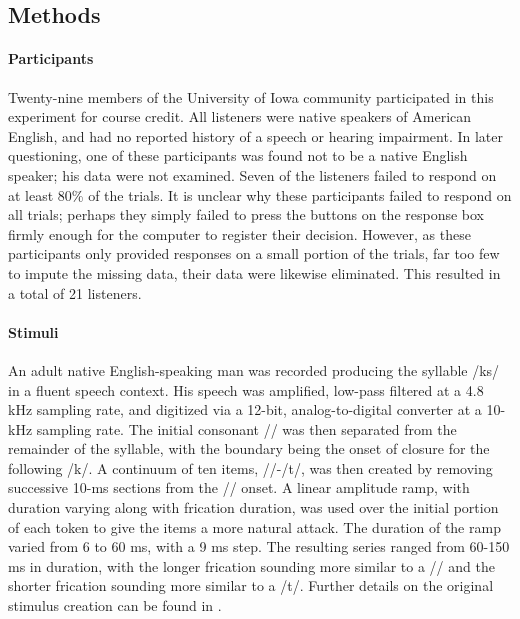 \subsection{Methods}

\paragraph{Participants}

Twenty-nine members of the University of Iowa community participated in this experiment for course credit. All listeners were native speakers of American English, and had no reported history of a speech or hearing impairment. In later questioning, one of these participants was found not to be a native English speaker; his data were not examined. Seven of the listeners failed to respond on at least 80\% of the trials. It is unclear why these participants failed to respond on all trials; perhaps they simply failed to press the buttons on the response box firmly enough for the computer to register their decision. However, as these participants only provided responses on a small portion of the trials, far too few to impute the missing data, their data were likewise eliminated. This resulted in a total of 21 listeners.

\paragraph{Stimuli}

An adult native English-speaking man was recorded producing the syllable /\textesh k\textscripta s/ in a fluent speech context. His speech was amplified, low-pass filtered at a 4.8 kHz sampling rate, and digitized via a 12-bit, analog-to-digital converter at a 10-kHz sampling rate. The initial consonant /\textesh/ was then separated from the remainder of the syllable, with the boundary being the onset of closure for the following /k/. A continuum of ten items, /\textesh/-/t\textesh/, was then created by removing successive 10-ms sections from the /\textesh/ onset. A linear amplitude ramp, with duration varying along with frication duration, was used over the initial portion of each token to give the items a more natural attack. The duration of the ramp varied from 6 to 60 ms, with a 9 ms step. The resulting series ranged from 60-150 ms in duration, with the longer frication sounding more similar to a /\textesh/ and the shorter frication sounding more similar to a /t\textesh/. Further details on the original stimulus creation can be found in \citet{newmanPerceptualNormalizationSpeaking1996}. 

